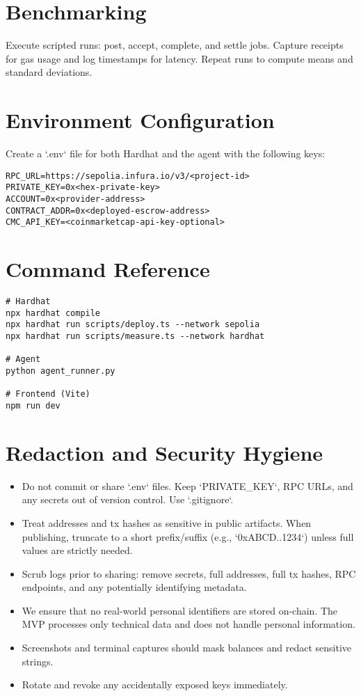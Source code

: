 \section{Benchmarking}
Execute scripted runs: post, accept, complete, and settle jobs. Capture receipts for gas usage and log timestamps for latency. Repeat runs to compute means and standard deviations.

\section{Environment Configuration}
Create a `.env` file for both Hardhat and the agent with the following keys:
\begin{lstlisting}[style=code]
RPC_URL=https://sepolia.infura.io/v3/<project-id>
PRIVATE_KEY=0x<hex-private-key>
ACCOUNT=0x<provider-address>
CONTRACT_ADDR=0x<deployed-escrow-address>
CMC_API_KEY=<coinmarketcap-api-key-optional>
\end{lstlisting}

\section{Command Reference}
\begin{lstlisting}[style=code]
# Hardhat
npx hardhat compile
npx hardhat run scripts/deploy.ts --network sepolia
npx hardhat run scripts/measure.ts --network hardhat

# Agent
python agent_runner.py

# Frontend (Vite)
npm run dev
\end{lstlisting}

\section{Redaction and Security Hygiene}
\begin{itemize}
  \item Do not commit or share `.env` files. Keep `PRIVATE_KEY`, RPC URLs, and any secrets out of version control. Use `.gitignore`.
  \item Treat addresses and tx hashes as sensitive in public artifacts. When publishing, truncate to a short prefix/suffix (e.g., `0xABCD..1234`) unless full values are strictly needed.
  \item Scrub logs prior to sharing: remove secrets, full addresses, full tx hashes, RPC endpoints, and any potentially identifying metadata.
  \item We ensure that no real-world personal identifiers are stored on-chain. The MVP processes only technical data and does not handle personal information.
  \item Screenshots and terminal captures should mask balances and redact sensitive strings.
  \item Rotate and revoke any accidentally exposed keys immediately.
\end{itemize}

